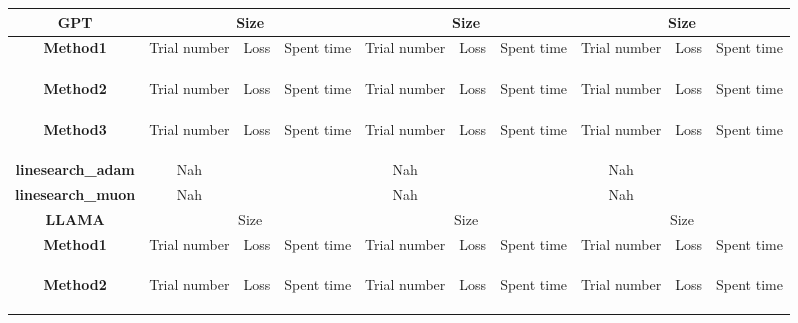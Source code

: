 \begin{table}[htbp]
\centering
\begin{tabular}{c|c|c|c|c|c|c|c|c|c}
\hline
\textbf{GPT}
& \multicolumn{3}{c|}{Size}
& \multicolumn{3}{c|}{Size}
& \multicolumn{3}{c}{Size} \\
\hline

\textbf{Method1}
& Trial number & Loss & Spent time
& Trial number & Loss & Spent time
& Trial number & Loss & Spent time \\
\hline
& & & & & & & & & \\
\hline
& & & & & & & & & \\
\hline
& & & & & & & & & \\
\hline

\textbf{Method2}
& Trial number & Loss & Spent time
& Trial number & Loss & Spent time
& Trial number & Loss & Spent time \\
\hline
& & & & & & & & & \\
\hline
& & & & & & & & & \\
\hline
& & & & & & & & & \\
\hline

\textbf{Method3}
& Trial number & Loss & Spent time
& Trial number & Loss & Spent time
& Trial number & Loss & Spent time \\
\hline
& & & & & & & & & \\
\hline
& & & & & & & & & \\
\hline
& & & & & & & & & \\
\hline

\textbf{linesearch_adam}
& Nah & & 
& Nah & & 
& Nah & & \\
\hline

\textbf{linesearch_muon}
& Nah & & 
& Nah & & 
& Nah & & \\
\hline

\textbf{LLAMA}
& \multicolumn{3}{c|}{Size}
& \multicolumn{3}{c|}{Size}
& \multicolumn{3}{c}{Size} \\
\hline

\textbf{Method1}
& Trial number & Loss & Spent time
& Trial number & Loss & Spent time
& Trial number & Loss & Spent time \\
\hline
& & & & & & & & & \\
\hline
& & & & & & & & & \\
\hline
& & & & & & & & & \\
\hline

\textbf{Method2}
& Trial number & Loss & Spent time
& Trial number & Loss & Spent time
& Trial number & Loss & Spent time \\
\hline
& & & & & & & & & \\
\hline
& & & & & & & & & \\
\hline
& & & & & & & & & \\
\hline


\end{tabular}
\end{table}
